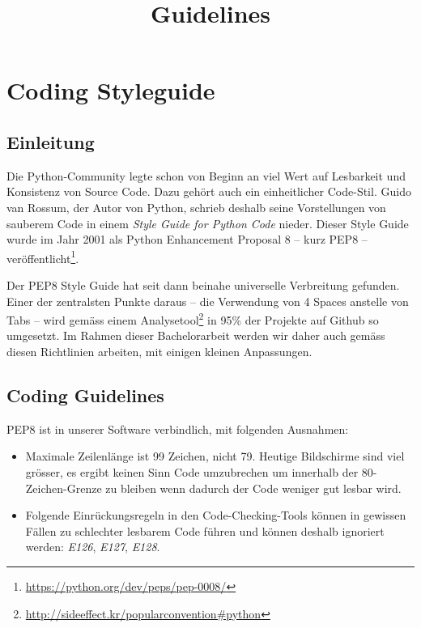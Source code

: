 \documentclass{article}
\begin{document}
\title{Guidelines}

\maketitle

\tableofcontents

\section{Coding Styleguide}

\subsection{Einleitung}

Die Python-Community legte schon von Beginn an viel Wert auf Lesbarkeit und
Konsistenz von Source Code. Dazu gehört auch ein einheitlicher Code-Stil.  Guido
van Rossum, der Autor von Python, schrieb deshalb seine Vorstellungen von
sauberem Code in einem \textit{Style Guide for Python Code} nieder. Dieser Style
Guide wurde im Jahr 2001 als Python Enhancement Proposal 8 -- kurz PEP8 --
veröffentlicht\footnote{\url{https://python.org/dev/peps/pep-0008/}}.

Der PEP8 Style Guide hat seit dann beinahe universelle Verbreitung gefunden.
Einer der zentralsten Punkte daraus -- die Verwendung von 4 Spaces anstelle von
Tabs -- wird gemäss einem
Analysetool\footnote{\url{http://sideeffect.kr/popularconvention\#python}} in
95\% der Projekte auf Github so umgesetzt. Im Rahmen dieser Bachelorarbeit
werden wir daher auch gemäss diesen Richtlinien arbeiten, mit einigen kleinen
Anpassungen.

\subsection{Coding Guidelines}

PEP8 ist in unserer Software verbindlich, mit folgenden Ausnahmen:

\begin{itemize}
	\item Maximale Zeilenlänge ist 99 Zeichen, nicht 79. Heutige Bildschirme sind
		viel grösser, es ergibt keinen Sinn Code umzubrechen um innerhalb der
		80-Zeichen-Grenze zu bleiben wenn dadurch der Code weniger gut lesbar wird.
	\item Folgende Einrückungsregeln in den Code-Checking-Tools können in gewissen
		Fällen zu schlechter lesbarem Code führen und können deshalb ignoriert
		werden: \textit{E126}, \textit{E127}, \textit{E128}.
\end{itemize}
\end{document}
